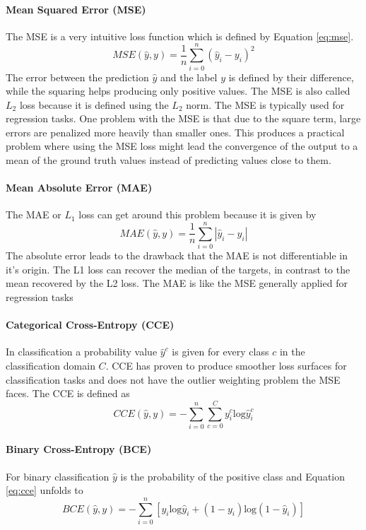 \paragraph{Mean Squared Error (MSE)}
The MSE is a very intuitive loss function which is defined by Equation \ref{eq:mse}.
\begin{equation}\label{eq:mse}
MSE(\hat{y}, y) = \frac{1}{n} \sum_{i = 0}^{n}(\hat{y}_i - y_i)^2
\end{equation}
The error between the prediction $\hat{y}$ and the label $y$ is defined by their difference, while the squaring helps producing only positive values. The MSE is also called $L_2$ loss because it is defined using the $L_2$ norm.
The MSE is typically used for regression tasks.
One problem with the MSE is that due to the square term,
large errors are penalized more heavily than smaller ones. This
produces a practical problem where using the MSE loss might lead
the convergence of the output to a mean of the ground truth values
instead of predicting values close to them.\cite{ValdenegroToro2019DeepNN}
\paragraph{Mean Absolute Error (MAE)}
The MAE or $L_1$ loss can get around this problem because it is given by
\begin{equation}
MAE(\hat{y}, y) = \frac{1}{n} \sum_{i = 0}^{n}|\hat{y}_i - y_i|
\end{equation}
The absolute error leads to the drawback that the MAE is not differentiable in it's origin.
The L1 loss can recover the median
of the targets, in contrast to the mean recovered by the L2 loss.\cite{ValdenegroToro2019DeepNN}
The MAE is like the MSE generally applied for regression tasks
\paragraph{Categorical Cross-Entropy (CCE)}
In classification a probability value $\hat{y}^c$ is given for every class $c$ in the classification domain $C$. 
CCE has proven to produce smoother loss surfaces for classification tasks and does not have the outlier weighting problem the MSE faces.
The CCE is defined as
\begin{equation}\label{eq:cce}
CCE(\hat{y}, y) = - \sum^n_{i = 0} \sum^C_{c = 0} y_i^c \mathrm{log} \hat{y}_i^c
\end{equation} 


\paragraph{Binary Cross-Entropy (BCE)}
For binary classification $\hat{y}$ is the probability of the positive class and Equation \ref{eq:cce} unfolds to 
\begin{equation}
BCE(\hat{y}, y) = - \sum^n_{i = 0} \left[ y_i \mathrm{log} \hat{y}_i + (1-y_i) \mathrm{log}(1-\hat{y}_i) \right]
\end{equation}

